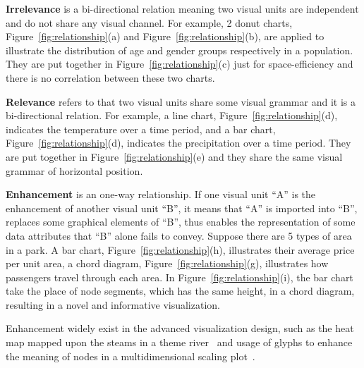 \textbf{Irrelevance} is a bi-directional relation meaning two visual units are independent and do not share any visual channel.
For example, 2 donut charts, Figure~\ref{fig:relationship}(a) and Figure~\ref{fig:relationship}(b), are applied to illustrate the distribution of age and gender groups respectively in a population. They are put together in Figure~\ref{fig:relationship}(c) just for space-efficiency and there is no correlation between these two charts. 

\noindent
\textbf{Relevance} refers to that two visual units share some visual grammar and it is a bi-directional relation. 
For example, a line chart, Figure~\ref{fig:relationship}(d), indicates the temperature over a time period, and a bar chart, Figure~\ref{fig:relationship}(d), indicates the precipitation over a time period. They are put together in Figure~\ref{fig:relationship}(e) and they share the same visual grammar of horizontal position.  


\noindent
\textbf{Enhancement} is an one-way relationship. If one visual unit ``A'' is the enhancement of another visual unit ``B'', it means that ``A'' is imported into ``B'', replaces some graphical elements of ``B'', thus enables the representation of some data attributes that ``B'' alone fails to convey. Suppose there are 5 types of area in a park. A bar chart, Figure~\ref{fig:relationship}(h), illustrates their average price per unit area, a chord diagram, Figure~\ref{fig:relationship}(g), illustrates how passengers travel through each area. In Figure~\ref{fig:relationship}(i), the bar chart take the place of node segments, which has the same height, in a chord diagram, resulting in a novel and informative visualization.
 
Enhancement widely exist in the advanced visualization design, such as the heat map mapped upon the steams in a theme river~\cite{wu_opinionflow:_2014}  and usage of glyphs to enhance the meaning of nodes in a multidimensional scaling plot~\cite{chen_peakvizor:_2016}. 

